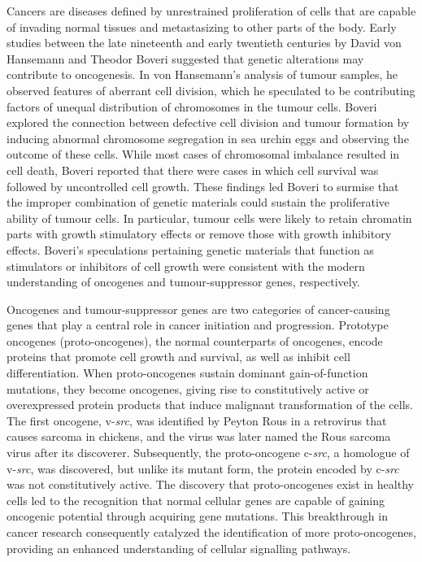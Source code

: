 Cancers are diseases defined by unrestrained proliferation of cells that are capable of invading normal tissues and metastasizing to other parts of the body. Early studies between the late nineteenth and early twentieth centuries by David von Hansemann and Theodor Boveri suggested that genetic alterations may contribute to oncogenesis. In von Hansemann's analysis of tumour samples, he observed features of aberrant cell division, which he speculated to be contributing factors of unequal distribution of chromosomes in the tumour cells. Boveri explored the connection between defective cell division and tumour formation by inducing abnormal chromosome segregation in sea urchin eggs and observing the outcome of these cells. While most cases of chromosomal imbalance resulted in cell death, Boveri reported that there were cases in which cell survival was followed by uncontrolled cell growth. These findings led Boveri to surmise that the improper combination of genetic materials could sustain the proliferative ability of tumour cells. In particular, tumour cells were likely to retain chromatin parts with growth stimulatory effects or remove those with growth inhibitory effects. Boveri's speculations pertaining genetic materials that function as stimulators or inhibitors of cell growth were consistent with the modern understanding of oncogenes and tumour-suppressor genes, respectively.

Oncogenes and tumour-suppressor genes are two categories of cancer-causing genes that play a central role in cancer initiation and progression. Prototype oncogenes (proto-oncogenes), the normal counterparts of oncogenes, encode proteins that promote cell growth and survival, as well as inhibit cell differentiation. When proto-oncogenes sustain dominant gain-of-function mutations, they become oncogenes, giving rise to constitutively active or overexpressed protein products that induce malignant transformation of the cells. The first oncogene, v-\textit{src}, was identified by Peyton Rous in a retrovirus that causes sarcoma in chickens, and the virus was later named the Rous sarcoma virus after its discoverer. Subsequently, the proto-oncogene c-\textit{src}, a homologue of v-\textit{src}, was discovered, but unlike its mutant form, the protein encoded by c-\textit{src} was not constitutively active. The discovery that proto-oncogenes exist in healthy cells led to the recognition that normal cellular genes are capable of gaining oncogenic potential through acquiring gene mutations. This breakthrough in cancer research consequently catalyzed the identification of more proto-oncogenes, providing an enhanced understanding of cellular signalling pathways.

